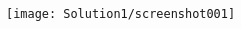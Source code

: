 \begin{Solution}{1}
	\begin{figure}[h!]
		\centering
		\texttt{[image: Solution1/screenshot001]}
		\caption[Exercise 1.2.5, Burden-Faires, 8ed.]{}
		\caption{}
		\label{fig:screenshot001}
	\end{figure}
\end{Solution}
